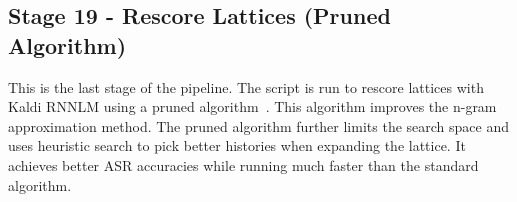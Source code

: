\subsection{ Stage 19 - Rescore Lattices (Pruned Algorithm)}
This is the last stage of the pipeline. The script  is run to rescore lattices with Kaldi RNNLM using a pruned algorithm~\cite{8461974}. This algorithm improves the n-gram approximation
method. The pruned algorithm further limits the search space and uses heuristic search to pick better histories when expanding the lattice. It achieves better ASR accuracies while running much
faster than the standard algorithm.